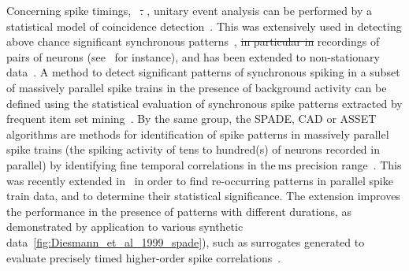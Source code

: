 \documentclass[brainsci, %
               review,accept,pdftex,moreauthors %
               ]{Definitions/mdpi}
\newcommand{\ms}{\si{\milli\second}}%
\providecommand{\DIFadd}[1]{{\protect\color{blue}\uwave{#1}}} %
\providecommand{\DIFdel}[1]{{\protect\color{red}\sout{#1}}}                      %
\providecommand{\DIFaddbegin}{} %
\providecommand{\DIFaddend}{} %
\providecommand{\DIFdelbegin}{} %
\providecommand{\DIFdelend}{} %
\newcommand{\DIFscaledelfig}{0.5}
\newlength{\DIFdelgraphicswidth} %
\newlength{\DIFdelgraphicsheight} %
\newcommand{\DIFaddincludegraphics}[2][]{{\color{blue}\fbox{\DIFOincludegraphics[#1]{#2}}}} %
\newcommand{\DIFdelincludegraphics}[2][]{%
\sbox{\DIFdelgraphicsbox}{\DIFOincludegraphics[#1]{#2}}%
\settoboxwidth{\DIFdelgraphicswidth}{\DIFdelgraphicsbox} %
\settoboxtotalheight{\DIFdelgraphicsheight}{\DIFdelgraphicsbox} %
\scalebox{\DIFscaledelfig}{%
\parbox[b]{\DIFdelgraphicswidth}{\usebox{\DIFdelgraphicsbox}\\[-\baselineskip] \rule{\DIFdelgraphicswidth}{0em}}\llap{\resizebox{\DIFdelgraphicswidth}{\DIFdelgraphicsheight}{%
\setlength{\unitlength}{\DIFdelgraphicswidth}%
\begin{picture}(1,1)%
\thicklines\linethickness{2pt} %
{\color[rgb]{1,0,0}\put(0,0){\framebox(1,1){}}}%
{\color[rgb]{1,0,0}\put(0,0){\line( 1,1){1}}}%
{\color[rgb]{1,0,0}\put(0,1){\line(1,-1){1}}}%
\end{picture}%
}\hspace*{3pt}}} %
} %
\DeclareRobustCommand{\DIFaddbegin}{\DIFOaddbegin \let\includegraphics\DIFaddincludegraphics} %
\DeclareRobustCommand{\DIFaddend}{\DIFOaddend \let\includegraphics\DIFOincludegraphics} %
\DeclareRobustCommand{\DIFdelbegin}{\DIFOdelbegin \let\includegraphics\DIFdelincludegraphics} %
\DeclareRobustCommand{\DIFdelend}{\DIFOaddend \let\includegraphics\DIFOincludegraphics} %
\begin{document}
Concerning spike timings,~\citet{levakova_review_2015} \DIFdelbegin %
\DIFdelend {} \DIFdelbegin \DIFdel{. }\DIFdelend {}, unitary event analysis can be performed by a statistical model of coincidence detection~\citep{grun_unitary_2002-1}. This was extensively used in detecting above chance significant synchronous patterns~\citep{grun_unitary_2010}, \DIFdelbegin \DIFdel{in particular in }\DIFdelend \DIFaddbegin \DIFadd{particularly in }\DIFaddend recordings of pairs of neurons (see~\citep{riehle_spike_1997} for instance), and has been extended to non-stationary data~\citep{grun_unitary_2002}. A method to detect significant patterns of synchronous spiking in a subset of massively parallel spike trains in the presence of background activity can be defined using the statistical evaluation of synchronous spike patterns extracted by frequent item set mining~\citep{torre_statistical_2013}. By the same group, the SPADE, CAD or ASSET algorithms are methods for identification of spike patterns in massively parallel spike trains (the spiking activity of tens to hundred(s) of neurons recorded in parallel) by identifying fine temporal correlations in the$~\ms$ precision range~\citep{quaglio_methods_2018}. This was recently extended in~\citep{stella_3d-spade_2019} in order to find re-occurring patterns in parallel spike train data, and to determine their statistical significance. The extension improves the performance in the presence of patterns with different durations, as demonstrated by application to various synthetic data\DIFaddbegin \DIFadd{, }\DIFaddend {}~\ref{fig:Diesmann_et_al_1999_spade}), such as surrogates generated to evaluate precisely timed higher-order spike correlations~\citep{stella_comparing_2022}.
\end{document}
